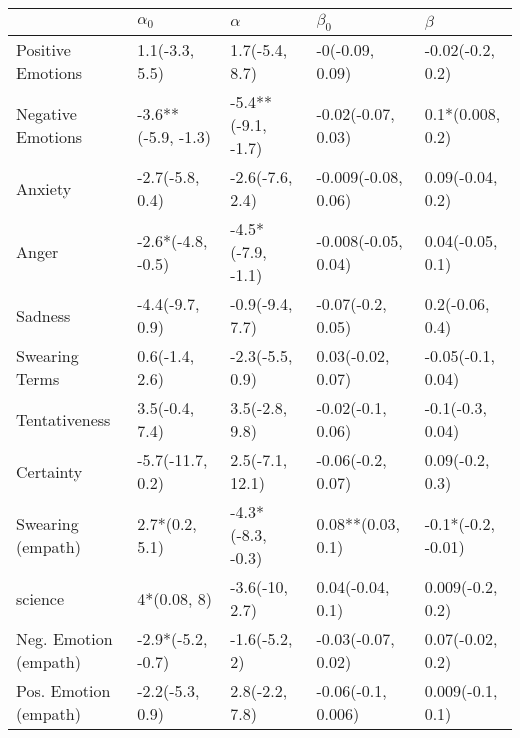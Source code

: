 \begin{tabular}{lllll}
\toprule
{} &          $\alpha_0$ &            $\alpha$ &            $\beta_0$ &             $\beta$ \\
\midrule
Positive Emotions     &      1.1(-3.3, 5.5) &      1.7(-5.4, 8.7) &      -0(-0.09, 0.09) &    -0.02(-0.2, 0.2) \\
Negative Emotions     &  -3.6**(-5.9, -1.3) &  -5.4**(-9.1, -1.7) &   -0.02(-0.07, 0.03) &    0.1*(0.008, 0.2) \\
Anxiety               &     -2.7(-5.8, 0.4) &     -2.6(-7.6, 2.4) &  -0.009(-0.08, 0.06) &    0.09(-0.04, 0.2) \\
Anger                 &   -2.6*(-4.8, -0.5) &   -4.5*(-7.9, -1.1) &  -0.008(-0.05, 0.04) &    0.04(-0.05, 0.1) \\
Sadness               &     -4.4(-9.7, 0.9) &     -0.9(-9.4, 7.7) &    -0.07(-0.2, 0.05) &     0.2(-0.06, 0.4) \\
Swearing Terms        &      0.6(-1.4, 2.6) &     -2.3(-5.5, 0.9) &    0.03(-0.02, 0.07) &   -0.05(-0.1, 0.04) \\
Tentativeness         &      3.5(-0.4, 7.4) &      3.5(-2.8, 9.8) &    -0.02(-0.1, 0.06) &    -0.1(-0.3, 0.04) \\
Certainty             &    -5.7(-11.7, 0.2) &     2.5(-7.1, 12.1) &    -0.06(-0.2, 0.07) &     0.09(-0.2, 0.3) \\
Swearing (empath)     &      2.7*(0.2, 5.1) &   -4.3*(-8.3, -0.3) &    0.08**(0.03, 0.1) &  -0.1*(-0.2, -0.01) \\
science               &         4*(0.08, 8) &      -3.6(-10, 2.7) &     0.04(-0.04, 0.1) &    0.009(-0.2, 0.2) \\
Neg. Emotion (empath) &   -2.9*(-5.2, -0.7) &       -1.6(-5.2, 2) &   -0.03(-0.07, 0.02) &    0.07(-0.02, 0.2) \\
Pos. Emotion (empath) &     -2.2(-5.3, 0.9) &      2.8(-2.2, 7.8) &   -0.06(-0.1, 0.006) &    0.009(-0.1, 0.1) \\
\bottomrule
\end{tabular}
